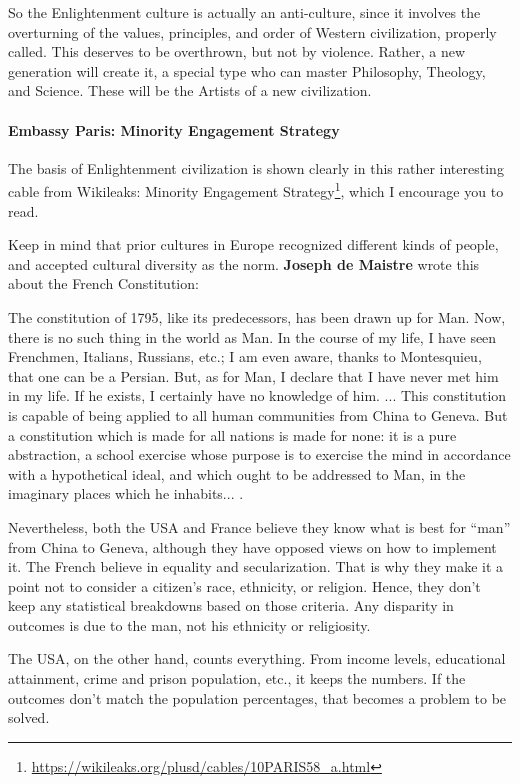 So the Enlightenment culture is actually an anti-culture, since it involves the overturning of the values, principles, and order of Western civilization, properly called. This deserves to be overthrown, but not by violence. Rather, a new generation will create it, a special type who can master Philosophy, Theology, and Science. These will be the Artists of a new civilization.

\paragraph{Embassy Paris: Minority Engagement Strategy}


The basis of Enlightenment civilization is shown clearly in this rather interesting cable from Wikileaks: Minority Engagement Strategy\footnote{\url{https://wikileaks.org/plusd/cables/10PARIS58\_a.html}}, which I encourage you to read.

Keep in mind that prior cultures in Europe recognized different kinds of people, and accepted cultural diversity as the norm. \textbf{Joseph de Maistre} wrote this about the French Constitution:

\begin{quotex}
The constitution of 1795, like its predecessors, has been drawn up for Man. Now, there is no such thing in the world as Man. In the course of my life, I have seen Frenchmen, Italians, Russians, etc.; I am even aware, thanks to Montesquieu, that one can be a Persian. But, as for Man, I declare that I have never met him in my life. If he exists, I certainly have no knowledge of him. ... This constitution is capable of being applied to all human communities from China to Geneva. But a constitution which is made for all nations is made for none: it is a pure abstraction, a school exercise whose purpose is to exercise the mind in accordance with a hypothetical ideal, and which ought to be addressed to Man, in the imaginary places which he inhabits... .
\end{quotex}


Nevertheless, both the USA and France believe they know what is best for ``man'' from China to Geneva, although they have opposed views on how to implement it. The French believe in equality and secularization. That is why they make it a point not to consider a citizen's race, ethnicity, or religion. Hence, they don't keep any statistical breakdowns based on those criteria. Any disparity in outcomes is due to the man, not his ethnicity or religiosity.

The USA, on the other hand, counts everything. From income levels, educational attainment, crime and prison population, etc., it keeps the numbers. If the outcomes don't match the population percentages, that becomes a problem to be solved.

